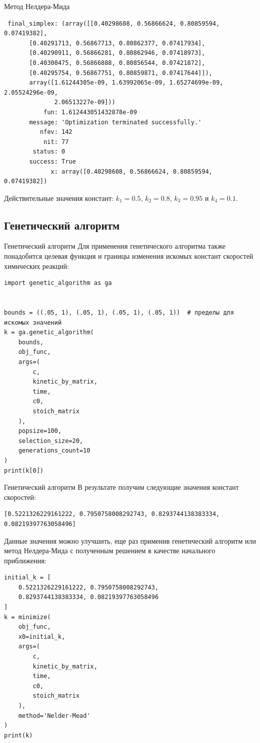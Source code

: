 \documentclass[aspectratio=169, mathserif]{beamer}	%
\begin{document}
\begin{frame}[fragile, label=c]{Метод Нелдера-Мида}
\scriptsize
\begin{verbatim}
 final_simplex: (array([[0.40298608, 0.56866624, 0.80859594, 0.07419382],
       [0.40291713, 0.56867713, 0.80862377, 0.07417934],
       [0.40290911, 0.56866281, 0.80862946, 0.07418973],
       [0.40300475, 0.56866888, 0.80856544, 0.07421872],
       [0.40295754, 0.56867751, 0.80859871, 0.07417644]]),
       array([1.61244305e-09, 1.63992065e-09, 1.65274699e-09, 2.05524296e-09,
              2.06513227e-09]))
           fun: 1.612443051432878e-09
       message: 'Optimization terminated successfully.'
          nfev: 142
           nit: 77
        status: 0
       success: True
             x: array([0.40298608, 0.56866624, 0.80859594, 0.07419382])
\end{verbatim}
\vfill
Действительные значения констант: $k_1=0.5$, $k_2=0.8$, $k_3=0.95$ и $k_4=0.1$.
\vfill
\end{frame}


\subsection{Генетический алгоритм}
\begin{frame}[fragile, label=c]{Генетический алгоритм}
\scriptsize
Для применения генетического алгоритма также понадобится целевая функция и границы изменения искомых констант скоростей химических реакций:
\vfill
\begin{verbatim}
import genetic_algorithm as ga


bounds = ((.05, 1), (.05, 1), (.05, 1), (.05, 1))  # пределы для искомых значений
k = ga.genetic_algorithm(
    bounds,
    obj_func,
    args=(
        c,
        kinetic_by_matrix,
        time,
        c0,
        stoich_matrix
    ),
    popsize=100,
    selection_size=20,
    generations_count=10
)
print(k[0])
\end{verbatim}
\vfill
\end{frame}


\begin{frame}[fragile, label=c]{Генетический алгоритм}
\scriptsize
В результате получим следующие значения констант скоростей:
\vfill
\begin{verbatim}
[0.5221326229161222, 0.7950758008292743, 0.8293744138383334, 0.08219397763058496]
\end{verbatim}
\vfill
Данные значения можно улучшить, еще раз применив генетический алгоритм или метод Нелдера-Мида с полученным решением в качестве начального приближения:
\vfill
\begin{verbatim}
initial_k = [
    0.5221326229161222, 0.7950758008292743,
    0.8293744138383334, 0.08219397763058496
]
k = minimize(
    obj_func,
    x0=initial_k,
    args=(
        c,
        kinetic_by_matrix,
        time,
        c0,
        stoich_matrix
    ),
    method='Nelder-Mead'
)
print(k)
\end{verbatim}
\vfill
\end{frame}
\end{document}
